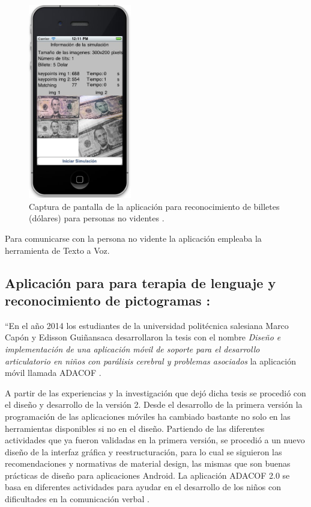\documentclass[a4paper,10pt]{article}
\begin{document}
\begin{figure}[th!]
	\centering
	\includegraphics[width = 0.4\textwidth]{images/ReconocimientoBilletesEjemplo.png}
	\caption{Captura de pantalla de la aplicación para reconocimiento de billetes (dólares) para personas no videntes \cite{plaza2011estudio}.}
	\label{Fig:ReconocimientoBilletes}
\end{figure}


Para comunicarse con la persona no vidente la aplicación empleaba la herramienta de Texto a Voz.


\subsection{Aplicación para para terapia de lenguaje y reconocimiento de pictogramas \cite{gonzalez2019}:}

``En el año 2014 los estudiantes de la universidad politécnica salesiana Marco Capón y Edisson Guiñansaca desarrollaron la tesis con el nombre \textit{Diseño e implementación de una aplicación móvil de soporte para el desarrollo articulatorio en niños con parálisis cerebral y problemas asociados} la aplicación móvil llamada ADACOF \cite{timbi2015adacof} \cite{gonzalez2019}.

A partir de las experiencias y la investigación que dejó dicha tesis se procedió con el diseño y desarrollo de la versión 2. Desde el desarrollo de la primera versión la programación de las aplicaciones móviles ha cambiado bastante no solo en las herramientas disponibles si no en el diseño. Partiendo de las diferentes actividades que ya fueron validadas en la primera versión, se procedió a un nuevo diseño de la interfaz gráfica y reestructuración, para lo cual se siguieron las recomendaciones y normativas de material design, las mismas que son buenas prácticas de diseño para aplicaciones Android. La aplicación ADACOF 2.0 se basa en diferentes actividades para ayudar en el desarrollo de los niños con dificultades en la comunicación verbal \cite{gonzalez2019}.
\end{document}
